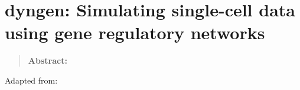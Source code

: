 \newpage{\thispagestyle{empty}\cleardoublepage}
\chapter{dyngen: Simulating single-cell data using gene regulatory networks} 
\label{chap:dyngen}

\begin{quote}
	\textbf{Abstract:} 
\end{quote}

\vfill

Adapted from:\\

\newpage

\blindtext